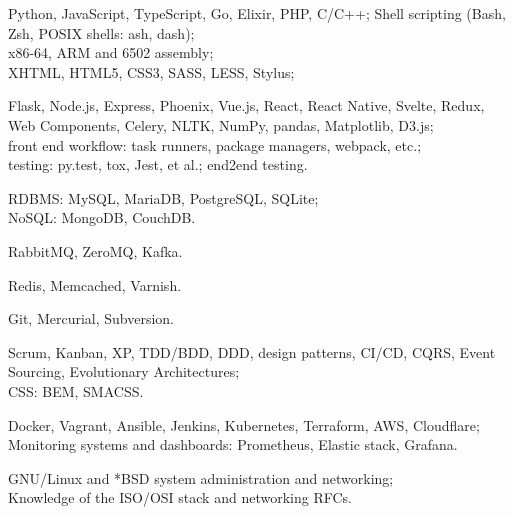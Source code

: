 \documentclass{resume}
\begin{document}
\begin{skillssection}
        {Python, JavaScript, TypeScript, Go, Elixir, PHP, C/C++; Shell
            scripting (Bash, Zsh, POSIX shells: ash, dash);\\%
            x86-64, ARM and 6502 assembly;\\%
            XHTML, HTML5, CSS3, SASS, LESS, Stylus;}

        {Flask, Node.js, Express, Phoenix, Vue.js, React, React Native, Svelte,
            Redux, Web Components, Celery, NLTK, NumPy, pandas, Matplotlib,
            D3.js;\\%
            front end workflow: task runners, package managers, webpack,
            etc.;\\%
            testing: py.test, tox, Jest, et al.; end2end testing.}

        {RDBMS: MySQL, MariaDB, PostgreSQL, SQLite;\\%
            NoSQL: MongoDB, CouchDB.}

        {RabbitMQ, ZeroMQ, Kafka.}

        {Redis, Memcached, Varnish.}

        {Git, Mercurial, Subversion.}

        {Scrum, Kanban, XP, TDD/BDD, DDD, design patterns, CI/CD, CQRS, Event
            Sourcing, Evolutionary Architectures;\\%
            CSS: BEM, SMACSS.}

        {Docker, Vagrant, Ansible, Jenkins, Kubernetes, Terraform, AWS,
            Cloudflare;\\%
            Monitoring systems and dashboards: Prometheus, Elastic stack,
            Grafana.}

        {GNU/Linux and *BSD system administration and networking;\\%
            Knowledge of the ISO/OSI stack and networking RFCs.}
\end{skillssection}
\end{document}

